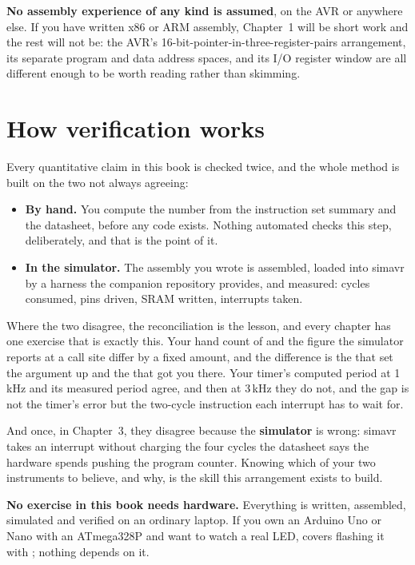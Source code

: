 \textbf{No assembly experience of any kind is assumed}, on the AVR or anywhere else. If you have
written x86 or ARM assembly, Chapter~1 will be short work and the rest will not be: the AVR's
16-bit-pointer-in-three-register-pairs arrangement, its separate program and data address spaces,
and its I/O register window are all different enough to be worth reading rather than skimming.

\section*{How verification works}
Every quantitative claim in this book is checked twice, and the whole method is built on the two
not always agreeing:
\begin{itemize}
  \item \textbf{By hand.} You compute the number from the instruction set summary and the
    datasheet, before any code exists. Nothing automated checks this step, deliberately, and that
    is the point of it.
  \item \textbf{In the simulator.} The assembly you wrote is assembled, loaded into simavr by a
    harness the companion repository provides, and measured: cycles consumed, pins driven, SRAM
    written, interrupts taken.
\end{itemize}
Where the two disagree, the reconciliation is the lesson, and every chapter has one exercise that
is exactly this. Your hand count of  and the figure the simulator reports at a
call site differ by a fixed amount, and the difference is the  that set the argument up
and the  that got you there. Your timer's computed period at 1\,kHz and its
measured period agree, and then at 3\,kHz they do not, and the gap is not the timer's error but
the two-cycle instruction each interrupt has to wait for.

And once, in Chapter~3, they disagree because the \textbf{simulator} is wrong: simavr takes an
interrupt without charging the four cycles the datasheet says the hardware spends pushing the
program counter. Knowing which of your two instruments to believe, and why, is the skill this
arrangement exists to build.

\textbf{No exercise in this book needs hardware.} Everything is written, assembled, simulated and
verified on an ordinary laptop. If you own an Arduino Uno or Nano with an ATmega328P and want to
watch a real LED,  covers flashing it with ; nothing depends
on it.

